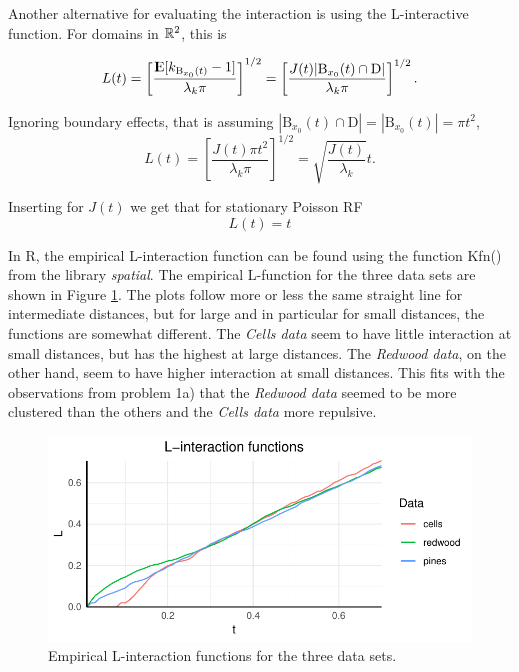Another alternative for evaluating the interaction is using the L-interactive function. For domains in $\mathbb{R}^2$, this is

\begin{equation}
    L(t) = \left[\frac{{\rm I\kern-.3em E}{[k_{\textrm{B}_{x_0}(t)}-1]}}{\lambda_k \pi}\right]^{1/2} = \left[\frac{J(t)|\textrm{B}_{x_0}(t) \cap \textrm{D}|}{\lambda_k \pi}\right]^{1/2}.
\end{equation}

Ignoring boundary effects, that is assuming $|\textrm{B}_{x_0}(t) \cap \textrm{D}| = |\textrm{B}_{x_0}(t)| = \pi t^2$, 
\begin{equation}
    L(t) = \left[\frac{J(t)\pi t^2}{\lambda_k \pi}\right]^{1/2} = \sqrt{\frac{J(t)}{\lambda_k}}t .
    \label{eq:L_function}
\end{equation}

Inserting for $J(t)$ we get that for stationary Poisson RF
\begin{equation}
    L(t) = t
\end{equation}

In R, the empirical L-interaction function can be found using the function Kfn() from the library \textit{spatial}. The empirical L-function for the three data sets are shown in Figure \ref{fig:L_emp}. The plots follow more or less the same straight line for intermediate distances, but for large and in particular for small distances, the functions are somewhat different. The \textit{Cells data} seem to have little interaction at small distances, but has the highest at large distances. The \textit{Redwood data}, on the other hand, seem to have higher interaction at small distances. This fits with the observations from problem 1a) that the \textit{Redwood data} seemed to be more clustered than the others and the \textit{Cells data} more repulsive. 

\begin{figure}
    \centering
    \includegraphics[scale=0.95]{figures/prob1_L_empirical.pdf}
    \caption{Empirical L-interaction functions for the three data sets.}
    \label{fig:L_emp}
\end{figure}

